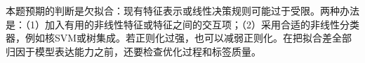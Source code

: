 本题预期的判断是欠拟合：现有特征表示或线性决策规则可能过于受限。两种办法是：（1）加入有用的非线性特征或特征之间的交互项；（2）采用合适的非线性分类器，例如核SVM或树集成。若正则化过强，也可以减弱正则化。在把拟合差全部归因于模型表达能力之前，还要检查优化过程和标签质量。
